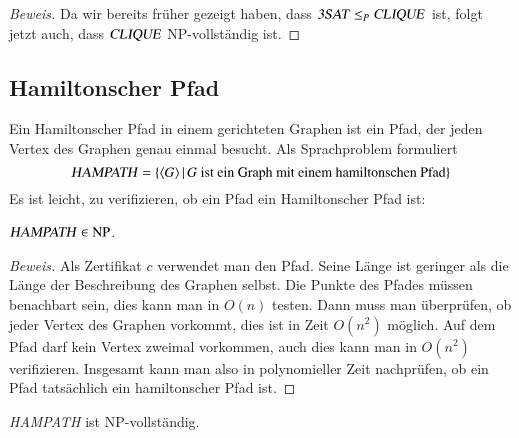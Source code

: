 \begin{proof}[Beweis]
Da wir bereits früher gezeigt haben, dass
$\text{\textsl{3SAT}}\le_P\text{\textsl{CLIQUE}}$ ist, folgt jetzt auch,
dass $\text{\textsl{CLIQUE}}$ NP-vollständig ist.
\end{proof}

\subsection{Hamiltonscher Pfad}
Ein Hamiltonscher Pfad in einem gerichteten Graphen ist ein Pfad, der jeden
Vertex des Graphen genau einmal besucht.
Als Sprachproblem formuliert 
\[
\text{\textsl{HAMPATH}}
=\{\langle G\rangle\,|\,\text{$G$ ist ein Graph mit einem hamiltonschen Pfad}\}
\]
Es ist leicht, zu verifizieren, ob
ein Pfad ein Hamiltonscher Pfad ist:
\begin{satz} $\text{\textsl{HAMPATH}}\in\text{NP}$.
\end{satz}

\begin{proof}[Beweis]
Als Zertifikat $c$ verwendet man den Pfad.
Seine Länge ist geringer
als die Länge der Beschreibung des Graphen selbst.
Die Punkte des Pfades müssen benachbart sein, dies kann man in 
$O(n)$ testen.
Dann muss man überprüfen, ob jeder Vertex des Graphen vorkommt,
dies ist in Zeit $O(n^2)$ möglich.
Auf dem Pfad darf kein Vertex
zweimal vorkommen, auch dies kann man in $O(n^2)$ verifizieren.
Insgesamt kann man also in polynomieller Zeit nachprüfen, ob ein
Pfad tatsächlich ein hamiltonscher Pfad ist.
\end{proof}

\begin{satz} \textsl{HAMPATH} ist NP-vollständig.
\end{satz}


